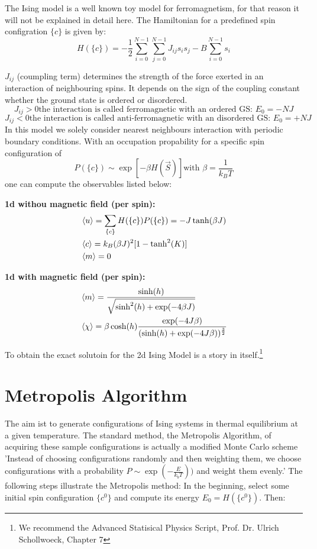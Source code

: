\documentclass[12pt,a4paper,titlepage]{article}
\begin{document}
The Ising model is a well known toy model for ferromagnetism, for that reason it will not be explained in detail here.
The Hamiltonian for a predefined spin configration $\{c\}$ is given by:
 \[H(\{c\})= - \frac{1}{2}\sum_{i=0}^{N-1} \sum_{j=0}^{N-1} J_{ij} s_i s_j - B \sum_{i=0}^{N-1}s_i\]

$J_{ij}$ (coumpling term) determines the strength of the force exerted in an interaction of neighbouring spins. It depends on the sign of the coupling constant whether the ground state is ordered or disordered. 
\[J_{ij} > 0 \text{the interaction is called ferromagnetic with an ordered GS: } E_0=-NJ\]
\[J_{ij} < 0 \text{the interaction is called anti-ferromagnetic with an disordered GS: } E_0=+NJ\]
In this model we solely consider nearest neighbours interaction with periodic boundary conditions.
With an occupation propability for a specific spin configuration of
\[P(\{c\}) \sim \exp[-\beta H(\vec{S})] \text{with } \beta = \frac{1}{k_B T}\]
one can compute the observables listed below:\newline

\textbf{1d withou magnetic field (per spin):}
\begin{align*}
&\braket{u} = \sum_{\{c\}}H(\{c\})P(\{c\}) = -J \tanh(\beta J)\\
&\braket{c} = k_B(\beta J)^2[1-\tanh^2(K)]\\
&\braket{m} = 0 
\end{align*} 


\textbf{1d with magnetic field (per spin):}
\begin{align*}
&\braket{m} = \frac{\sinh(h)}{\sqrt{\sinh^2(h) + \exp(-4\beta J) }}\\
&\braket{\chi}=\beta \cosh(h) \frac{\exp(-4J\beta)}{(\sinh(h)+\exp(-4J\beta))^{\frac{3}{2}}}
\end{align*}


To obtain the exact solutoin for the 2d Ising Model is a story in itself.\footnote[1]{We recommend the Advanced Statisical Physics Script,
\newline Prof. Dr. Ulrich Schollwoeck, Chapter 7}







\section{Metropolis Algorithm}

The aim ist to generate configurations of Ising systems in thermal equilibrium at a given temperature. The standard method, the Metropolis Algorithm, of acquiring these sample configurations is actually a modified Monte Carlo scheme 'Instead of choosing configurations randomly and then weighting them, we choose configurations with a probability $P\sim \exp(-\frac{E}{k_b T}))$ and weight them evenly.'\cite{metropolis}\newline
The following steps illustrate the Metropolis method:\newline
In the beginning, select some initial spin configuration $\{c^0\}$ and compute its energy $E_0 = H(\{c^0\})$.
Then:
\end{document}
